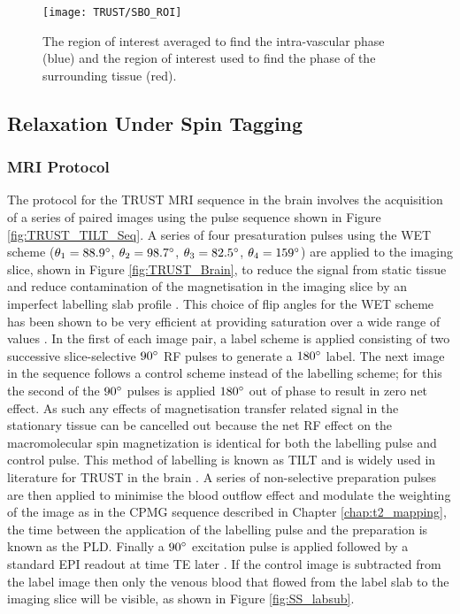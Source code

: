 \begin{figure}[H]
	\centering
	\texttt{[image: TRUST/SBO\_ROI]}
	\caption{The region of interest averaged to find the intra-vascular phase (blue) and the region of interest used to find the phase of the surrounding tissue (red).}
	\label{fig:SBO_ROI}	
\end{figure}


\subsection{\ttwo Relaxation Under Spin Tagging}

\subsubsection{\ac{MRI} Protocol}
\label{sec:TRUST_MRI}

The protocol for the \ac{TRUST} \ac{MRI} sequence in the brain involves the acquisition of a series of paired images using the pulse sequence shown in Figure \ref{fig:TRUST_TILT_Seq}. A series of four presaturation pulses using the \ac{WET} scheme ($\theta_1 = 88.9\degree$, $\theta_2 = 98.7\degree$, $\theta_3 = 82.5\degree$, $\theta_4 = 159\degree$) are applied to the imaging slice, shown in Figure \ref{fig:TRUST_Brain}, to reduce the signal from static tissue and reduce contamination of the magnetisation in the imaging slice by an imperfect labelling slab profile \cite{hendrikse_measurements_2003}. This choice of flip angles for the \ac{WET} scheme has been shown to be very efficient at providing saturation over a wide range of \tone values \cite{golay_pulsed_2005}. In the first of each image pair, a label scheme is applied consisting of two successive slice-selective $90\degree$ \ac{RF} pulses to generate a $180\degree$ label. The next image in the sequence follows a control scheme instead of the labelling scheme; for this the second of the $90\degree$ pulses is applied $180\degree$ out of phase to result in zero net effect. As such any effects of magnetisation transfer related signal in the stationary tissue can be cancelled out because the net \ac{RF} effect on the macromolecular spin magnetization is identical for both the labelling pulse and control pulse. This method of labelling is known as \ac{TILT} and is widely used in literature for \ac{TRUST} in the brain \cite{golay_transfer_1999}. A series of non-selective \ttwo preparation pulses are then applied to minimise the blood outflow effect and modulate the \ttwo weighting of the image as in the \ac{CPMG} sequence described in Chapter \ref{chap:t2_mapping}, the time between the application of the labelling pulse and the \ttwo preparation is known as the \ac{PLD}. Finally a $90\degree$ excitation pulse is applied followed by a standard \ac{EPI} readout at time \ac{TE} later \cite{xu_improving_2012}. If the control image is subtracted from the label image then only the venous blood that flowed from the label slab to the imaging slice will be visible, as shown in Figure \ref{fig:SS_labsub}.

